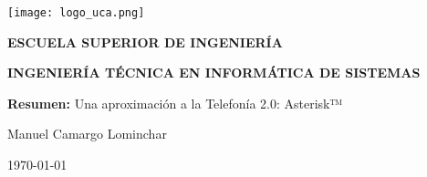 
\begin{titlepage}

  \begin{center}

    \texttt{[image: logo\_uca.png]} \\
    
    \vspace{2.0cm}
    
    \LARGE{\textbf{ESCUELA SUPERIOR DE INGENIERÍA}} \\
    
    \vspace{1.0cm}
    
    \Large{\textbf{INGENIERÍA TÉCNICA EN INFORMÁTICA DE SISTEMAS}} \\
    
    \vspace{3.0cm}
    
    \Large{\textbf{Resumen:} Una aproximación a la Telefonía 2.0: Asterisk™} \\
    
    \vspace{2.0cm}
    
    \Large{Manuel Camargo Lominchar} \\
  
    \vspace{0.5cm}

    \large{\today}
    
  \end{center}
\end{titlepage}


